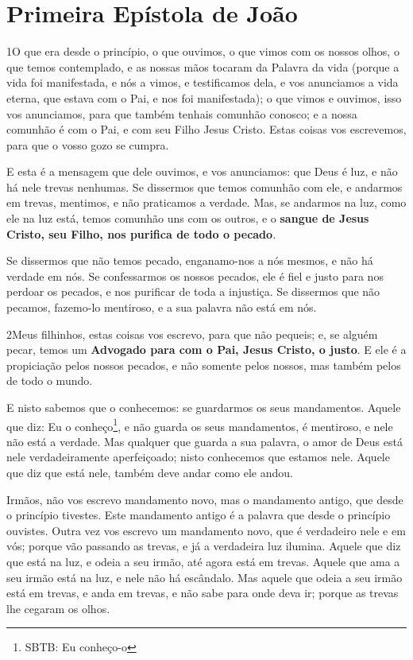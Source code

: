 \thispagestyle{empty}
\chapter*{Primeira Epístola de João}

\lettrine{1} O que era desde o princípio, o que ouvimos, o que
vimos com os nossos olhos, o que temos contemplado, e as nossas mãos
tocaram da Palavra da vida (porque a vida foi manifestada, e nós
a vimos, e testificamos dela, e vos anunciamos a vida eterna, que
estava com o Pai, e nos foi manifestada); o que vimos e ouvimos,
isso vos anunciamos, para que também tenhais comunhão conosco; e a
nossa comunhão é com o Pai, e com seu Filho Jesus Cristo. Estas
coisas vos escrevemos, para que o vosso gozo se cumpra.

E esta é a mensagem que dele ouvimos, e vos anunciamos: que Deus é
luz, e não há nele trevas nenhumas. Se dissermos que temos
comunhão com ele, e andarmos em trevas, mentimos, e não praticamos a
verdade. Mas, se andarmos na luz, como ele na luz está, temos
comunhão uns com os outros, e o \textbf{sangue de Jesus Cristo, seu
Filho, nos purifica de todo o pecado}.

Se dissermos que não temos pecado, enganamo-nos a nós mesmos, e
não há verdade em nós. Se confessarmos os nossos pecados, ele é
fiel e justo para nos perdoar os pecados, e nos purificar de toda a
injustiça. Se dissermos que não pecamos, fazemo-lo mentiroso,
e a sua palavra não está em nós.

\medskip

\lettrine{2} Meus filhinhos, estas coisas vos escrevo, para
que não pequeis; e, se alguém pecar, temos um \textbf{Advogado para
com o Pai, Jesus Cristo, o justo}. E ele é a propiciação pelos
nossos pecados, e não somente pelos nossos, mas também pelos de todo
o mundo.

E nisto sabemos que o conhecemos: se guardarmos os seus
mandamentos. Aquele que diz: Eu o conheço\footnote{SBTB: Eu
conheço-o}, e não guarda os seus mandamentos, é mentiroso, e nele
não está a verdade. Mas qualquer que guarda a sua palavra, o
amor de Deus está nele verdadeiramente aperfeiçoado; nisto
conhecemos que estamos nele. Aquele que diz que está nele,
também deve andar como ele andou.

Irmãos, não vos escrevo mandamento novo, mas o mandamento antigo,
que desde o princípio tivestes. Este mandamento antigo é a palavra
que desde o princípio ouvistes. Outra vez vos escrevo um
mandamento novo, que é verdadeiro nele e em vós; porque vão passando
as trevas, e já a verdadeira luz ilumina. Aquele que diz que
está na luz, e odeia a seu irmão, até agora está em trevas.
Aquele que ama a seu irmão está na luz, e nele não há
escândalo. Mas aquele que odeia a seu irmão está em trevas, e
anda em trevas, e não sabe para onde deva ir; porque as trevas lhe
cegaram os olhos.

